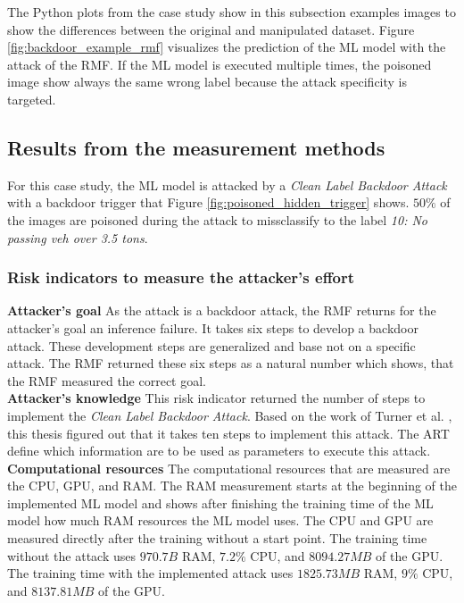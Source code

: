 The Python plots from the case study show in this subsection examples images to show the differences between the original and manipulated dataset. Figure \ref{fig:backdoor_example_rmf} visualizes the prediction of the ML model with the attack of the RMF. If the ML model is executed multiple times, the poisoned image show always the same wrong label because the attack specificity is targeted.

\subsection{Results from the measurement methods}

For this case study, the ML model is attacked by a \textit{Clean Label Backdoor Attack} with a backdoor trigger that Figure \ref{fig:poisoned_hidden_trigger} shows. $50\%$ of the images are poisoned during the attack to missclassify to the label \textit{10: No passing veh over 3.5 tons}.

\subsubsection*{Risk indicators to measure the attacker's effort}
\textbf{Attacker's goal} As the attack is a backdoor attack, the RMF returns for the attacker's goal an inference failure. It takes six steps to develop a backdoor attack. These development steps are generalized and base not on a specific attack. The RMF returned these six steps as a natural number which shows, that the RMF measured the correct goal. \\

\textbf{Attacker's knowledge} This risk indicator returned the number of steps to implement the \textit{Clean Label Backdoor Attack}. Based on the work of Turner et al. \cite{turner2018clean}, this thesis figured out that it takes ten steps to implement this attack. The ART \cite{art2018} define which information are to be used as parameters to execute this attack. \\

\textbf{Computational resources} The computational resources that are measured are the CPU, GPU, and RAM. The RAM measurement starts at the beginning of the implemented ML model and shows after finishing the training time of the ML model how much RAM resources the ML model uses. The CPU and GPU are measured directly after the training without a start point. The training time without the attack uses $970.7B$ RAM, $7.2\%$ CPU, and $8094.27MB$ of the GPU.\\ The training time with the implemented attack uses $1825.73MB$ RAM, $9\%$ CPU, and $8137.81MB$ of the GPU.

